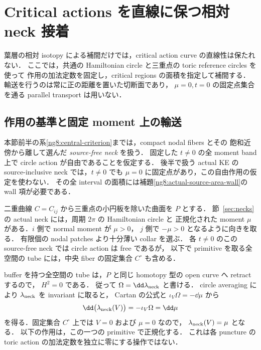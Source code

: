 \section{Critical actions を直線に保つ相対 neck 接着}
\label{ng8:section}

葉層の相対 isotopy による補間だけでは，critical action curve の直線性は保たれない．
ここでは，共通の Hamiltonian circle と三重点の toric reference circles を使って
作用の加法定数を固定し，critical regions の面積を指定して補間する．
輸送を行うのは常に正の距離を置いた切断面であり，
$\mu=0,t=0$ の固定点集合を通る parallel transport は用いない．

\subsection{作用の基準と固定 moment 上の輸送}

本節前半の系\ref{ng8:central-criterion}までは，compact nodal fibers とその
飽和近傍から離して選んだ \emph{source-free neck} を扱う．
固定した $t\ne0$ の全 moment band 上で circle action が自由であることを仮定する．
後半で扱う actual KE の source-inclusive neck では，$t\ne0$ でも
$\mu=0$ に固定点があり，この自由作用の仮定を使わない．
その全 interval の面積には補題\ref{ng8:actual-source-area-wall}の wall 項が必要である．

二重曲線 $C=C_{ij}$ から三重点の小円板を除いた曲面を $P$ とする．
節~\ref{sec:necks} の actual neck には，周期 $2\pi$ の Hamiltonian circle と
正規化された moment $\mu$ がある．$i$ 側で normal moment が $\mu>0$，
$j$ 側で $-\mu>0$ となるように向きを取る．
有限個の nodal patches より十分薄い collar を選ぶ．
各 $t\ne0$ のこの source-free neck では circle action は free であるが，
以下で primitive を取る全空間の tube には，中央 fiber の固定集合 $C^\circ$ も含める．

buffer を持つ全空間の tube は，$P$ と同じ homotopy 型の open curve へ retract するので，
$H^2=0$ である．
従って $\Omega=\dd\lambda_{\rm neck}$ と書ける．
circle averaging により $\lambda_{\rm neck}$ を invariant に取ると，
Cartan の公式と $\iota_V\Omega=-\dd\mu$ から
\[
 \dd\bigl(\lambda_{\rm neck}(V)\bigr)
 =-\iota_V\Omega=\dd\mu
\]
を得る．固定集合 $C^\circ$ 上では $V=0$ および $\mu=0$ なので，
$\lambda_{\rm neck}(V)=\mu$ となる．
以下の作用は，この一つの primitive で正規化する．
これは各 puncture の toric action の加法定数を独立に零にする操作ではない．


